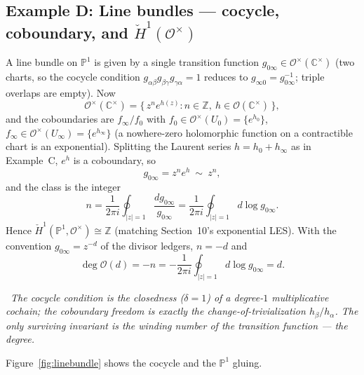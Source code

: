 \documentclass[11pt]{article}
\newcommand{\CC}{\mathbb C}
\newcommand{\ZZ}{\mathbb Z}
\newcommand{\PP}{\mathbb P}
\newcommand{\OO}{\mathcal O}
\newcommand{\Hcech}{\check H}
\newcommand{\diagnose}[1]{%
  \par\smallskip\noindent{\color{accent}\textbf{Diagnosis.}}\ \emph{#1}\par\smallskip}
\theoremstyle{plain}
\theoremstyle{definition}
\begin{document}
\subsection*{Example D: Line bundles --- cocycle, coboundary, and $\Hcech^1(\OO^\times)$}
A line bundle on $\PP^1$ is given by a single transition function
$g_{0\infty}\in\OO^\times(\CC^\times)$ (two charts, so the cocycle condition
$g_{\alpha\beta}g_{\beta\gamma}g_{\gamma\alpha}=1$ reduces to
$g_{\infty0}=g_{0\infty}^{-1}$; triple overlaps are empty). Now
\[
  \OO^\times(\CC^\times)=\{\,z^{n}e^{h(z)}:n\in\ZZ,\ h\in\OO(\CC^\times)\,\},
\]
and the coboundaries are $f_\infty/f_0$ with $f_0\in\OO^\times(U_0)=\{e^{h_0}\}$,
$f_\infty\in\OO^\times(U_\infty)=\{e^{h_\infty}\}$ (a nowhere-zero holomorphic
function on a contractible chart is an exponential). Splitting the Laurent series
$h=h_0+h_\infty$ as in Example~C, $e^{h}$ is a coboundary, so
\[
  g_{0\infty}=z^{n}e^{h}\ \sim\ z^{n},
\]
and the class is the integer
\[
  n=\frac{1}{2\pi i}\oint_{|z|=1}\frac{dg_{0\infty}}{g_{0\infty}}
   =\frac{1}{2\pi i}\oint_{|z|=1}d\log g_{0\infty}.
\]
Hence $\Hcech^1(\PP^1,\OO^\times)\cong\ZZ$ (matching Section~10's exponential
LES). With the convention $g_{0\infty}=z^{-d}$ of the divisor ledgers,
$n=-d$ and
\[
  \deg\OO(d)=-n=-\frac{1}{2\pi i}\oint_{|z|=1}d\log g_{0\infty}=d .
\]
\diagnose{The cocycle condition is the closedness ($\delta=1$) of a degree-$1$
multiplicative cochain; the coboundary freedom is exactly the change-of-trivialization
$h_\beta/h_\alpha$. The only surviving invariant is the winding number of the
transition function --- the degree.}

\noindent Figure~\ref{fig:linebundle} shows the cocycle and the $\PP^1$ gluing.
\end{document}
